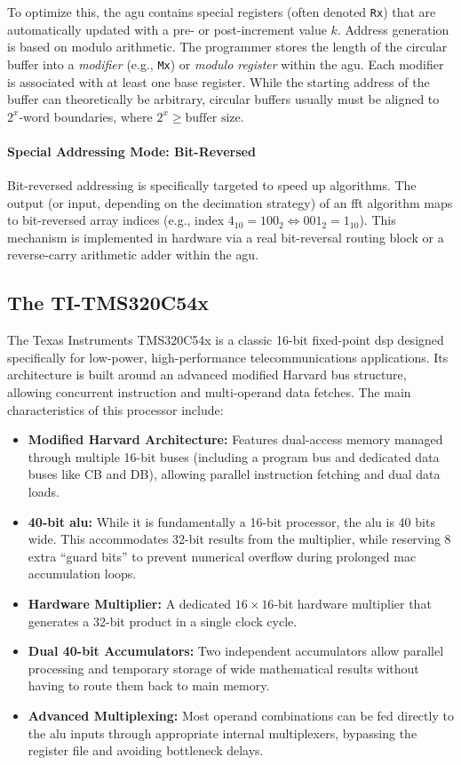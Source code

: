 \noindent To optimize this, the \gls{agu} contains special registers (often denoted \texttt{Rx}) that are automatically updated with a pre- or post-increment value \(k\). Address generation is based on modulo arithmetic. The programmer stores the length of the circular buffer into a \textit{modifier} (e.g., \texttt{Mx}) or \textit{modulo register} within the \gls{agu}. Each modifier is associated with at least one base register. While the starting address of the buffer can theoretically be arbitrary, circular buffers usually must be aligned to \(2^x\)-word boundaries, where \(2^x \geq \text{buffer size}\).

\paragraph{Special Addressing Mode: Bit-Reversed}
Bit-reversed addressing is specifically targeted to speed up  algorithms. The output (or input, depending on the decimation strategy) of an \gls{fft} algorithm maps to bit-reversed array indices (e.g., index \(4_{10} = 100_2 \Longleftrightarrow 001_2 = 1_{10}\)). This mechanism is implemented in hardware via a real bit-reversal routing block or a reverse-carry arithmetic adder within the \gls{agu}.

\subsection{The TI-TMS320C54x }
The Texas Instruments TMS320C54x is a classic 16-bit fixed-point \gls{dsp} designed specifically for low-power, high-performance telecommunications applications. Its architecture is built around an advanced modified Harvard bus structure, allowing concurrent instruction and multi-operand data fetches. The main characteristics of this processor include:
\begin{itemize}
    \item \textbf{Modified Harvard Architecture:} Features dual-access memory managed through multiple 16-bit buses (including a program bus and dedicated data buses like CB and DB), allowing parallel instruction fetching and dual data loads.
    \item \textbf{40-bit \gls{alu}:} While it is fundamentally a 16-bit processor, the \gls{alu} is 40 bits wide. This accommodates 32-bit results from the multiplier, while reserving 8 extra ``guard bits'' to prevent numerical overflow during prolonged \gls{mac} accumulation loops.
    \item \textbf{Hardware Multiplier:} A dedicated $16 \times 16$-bit hardware multiplier that generates a 32-bit product in a single clock cycle.
    \item \textbf{Dual 40-bit Accumulators:} Two independent accumulators allow parallel processing and temporary storage of wide mathematical results without having to route them back to main memory.
    \item \textbf{Advanced Multiplexing:} Most operand combinations can be fed directly to the \gls{alu} inputs through appropriate internal multiplexers, bypassing the register file and avoiding bottleneck delays.
\end{itemize}